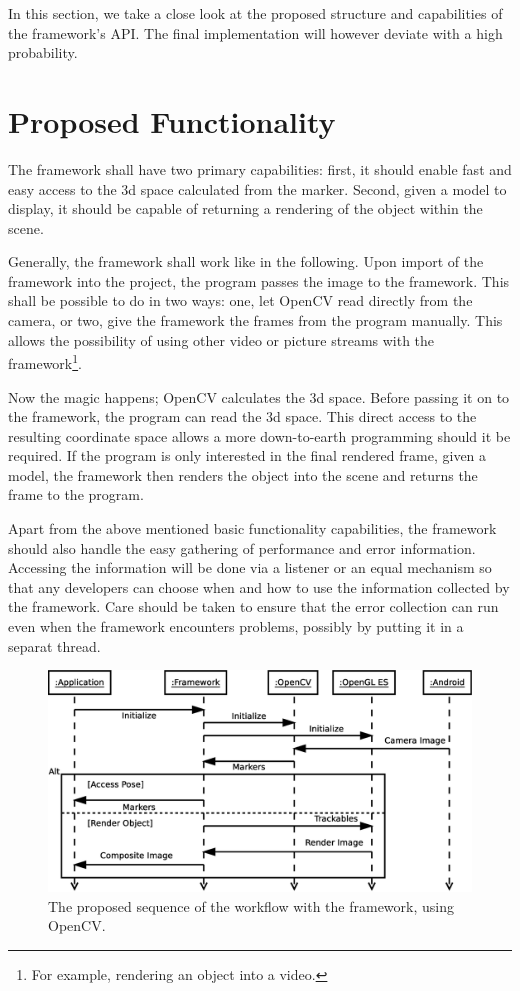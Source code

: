 In this section, we take a close look at the proposed structure and capabilities of the framework's API.
The final implementation will however deviate with a high probability.

\section{Proposed Functionality}

The framework shall have two primary capabilities: first, it should enable fast and easy access to the 3d space calculated from the marker.
Second, given a model to display, it should be capable of returning a rendering of the object within the scene.

Generally, the framework shall work like in the following.
Upon import of the framework into the project, the program passes the image to the framework.
This shall be possible to do in two ways: one, let OpenCV read directly from the camera, or two, give the framework the frames from the program manually.
This allows the possibility of using other video or picture streams with the framework\footnote{For example, rendering an object into a video.}.

Now the magic happens; OpenCV calculates the 3d space.
Before passing it on to the framework, the program can read the 3d space.
This direct access to the resulting coordinate space allows a more down-to-earth programming should it be required.
If the program is only interested in the final rendered frame, given a model, the framework then renders the object into the scene and returns the frame to the program.

Apart from the above mentioned basic functionality capabilities, the framework should also handle the easy gathering of performance and error information.
Accessing the information will be done via a listener or an equal mechanism so that any developers can choose when and how to use the information collected by the framework.
Care should be taken to ensure that the error collection can run even when the framework encounters problems, possibly by putting it in a separat thread.

\begin{figure}
	\centering
	\includegraphics[width=12cm]{img/sequence_access.eps}
	\caption[Access Sequence.]{The proposed sequence of the workflow with the framework, using OpenCV.}
	\label{fig:sequence_access}
\end{figure}

